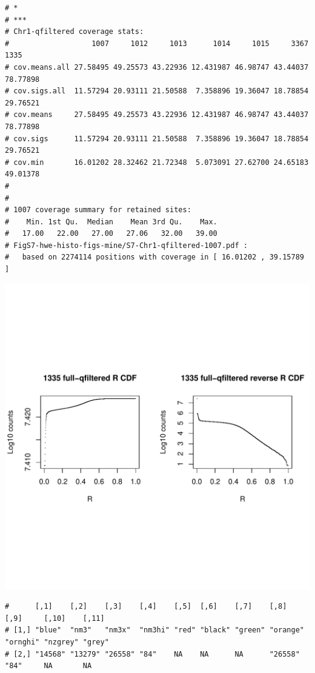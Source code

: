 \documentclass{article}\usepackage[]{graphicx}\usepackage[]{color}
\makeatletter
\def\maxwidth{ %
  \ifdim\Gin@nat@width>\linewidth
    \linewidth
  \else
    \Gin@nat@width
  \fi
}
\newenvironment{kframe}{%
 \def\at@end@of@kframe{}%
 \ifinner\ifhmode%
  \def\at@end@of@kframe{\end{minipage}}%
  \begin{minipage}{\columnwidth}%
 \fi\fi%
 \def\FrameCommand##1{\hskip\@totalleftmargin \hskip-\fboxsep
 \colorbox{shadecolor}{##1}\hskip-\fboxsep
     \hskip-\linewidth \hskip-\@totalleftmargin \hskip\columnwidth}%
 \MakeFramed {\advance\hsize-\width
   \@totalleftmargin\z@ \linewidth\hsize
   \@setminipage}}%
 {\par\unskip\endMakeFramed%
 \at@end@of@kframe}
\newenvironment{knitrout}{}{} %
\makeatother
\begin{document}
\begin{knitrout}
\begin{kframe}
\begin{verbatim}
# *
# ***
# Chr1-qfiltered coverage stats:
#                   1007     1012     1013      1014     1015     3367     1335
# cov.means.all 27.58495 49.25573 43.22936 12.431987 46.98747 43.44037 78.77898
# cov.sigs.all  11.57294 20.93111 21.50588  7.358896 19.36047 18.78854 29.76521
# cov.means     27.58495 49.25573 43.22936 12.431987 46.98747 43.44037 78.77898
# cov.sigs      11.57294 20.93111 21.50588  7.358896 19.36047 18.78854 29.76521
# cov.min       16.01202 28.32462 21.72348  5.073091 27.62700 24.65183 49.01378
# 
# 
# 1007 coverage summary for retained sites:
#    Min. 1st Qu.  Median    Mean 3rd Qu.    Max. 
#   17.00   22.00   27.00   27.06   32.00   39.00 
# FigS7-hwe-histo-figs-mine/S7-Chr1-qfiltered-1007.pdf :
#   based on 2274114 positions with coverage in [ 16.01202 , 39.15789 ]
\end{verbatim}
\end{kframe}
\includegraphics[width=\maxwidth]{FigS7-hwe-histo-figs-knitr/unnamed-chunk-10-42} 
\begin{kframe}\begin{verbatim}
#      [,1]    [,2]    [,3]    [,4]    [,5]  [,6]    [,7]    [,8]     [,9]     [,10]    [,11] 
# [1,] "blue"  "nm3"   "nm3x"  "nm3hi" "red" "black" "green" "orange" "ornghi" "nzgrey" "grey"
# [2,] "14568" "13279" "26558" "84"    NA    NA      NA      "26558"  "84"     NA       NA    

\end{verbatim}
\end{kframe}
\end{knitrout}
\end{document}
